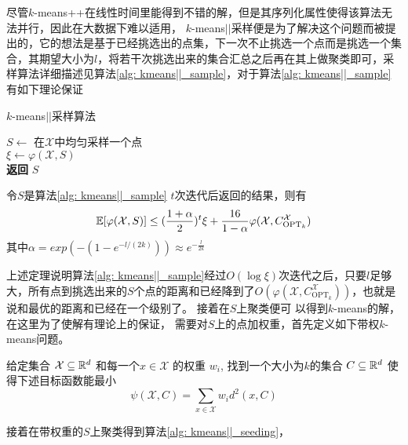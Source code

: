 尽管$k$-means++在线性时间里能得到不错的解，但是其序列化属性使得该算法无法并行，因此在大数据下难以适用， $k$-means\(\vert \vert\)采样便是为了解决这个问题而被提出的，它的想法是基于已经挑选出的点集，下一次不止挑选一个点而是挑选一个集合，其期望大小为$l$，将若干次挑选出来的集合汇总之后再在其上做聚类即可，采样算法详细描述见算法\ref{alg: kmeans||_sample}，对于算法\ref{alg: kmeans||_sample}有如下理论保证
\begin{algorithm}
    \caption{$k$-means\(\vert \vert\)采样算法}\label{alg: kmeans||_sample}
    $S \gets$ 在$\mathcal{X}$中均匀采样一个点 \\
    $\xi \gets \varphi(\mathcal{X},S)$ \\
    \textbf{返回} $S$
\end{algorithm}
\begin{theorem}
    \label{theo: kmeans||_performance_1}
    令$S$是算法\ref{alg: kmeans||_sample} $t$次迭代后返回的结果，则有
    \begin{equation*}
    \mathbb{E}[\varphi(\mathcal{X},S)] \leq (\frac{1+\alpha}{2})^t \xi + \frac{16}{1-\alpha}\varphi(\mathcal{X},C_{\text{OPT}_k}^{\mathcal{X}})
    \end{equation*}
    其中$\alpha=exp(-(1-e^{-l/(2k)})) \approx e^{-\frac{l}{2k}}$
\end{theorem}
上述定理说明算法\ref{alg: kmeans||_sample}经过$O(\log \xi)$次迭代之后，只要$l$足够大，所有点到挑选出来的$S$个点的距离和已经降到了$O(\varphi(\mathcal{X},C_{\text{OPT}_k}^\mathcal{X}))$，也就是说和最优的距离和已经在一个级别了。 接着在$S$上聚类便可
以得到$k$-means的解， 在这里为了使解有理论上的保证， 需要对$S$上的点加权重，首先定义如下带权$k$-means问题。
\begin{definition}[带权$k$-means问题]
    \label{def: weighted_kmeans}
    给定集合 $\mathcal{X} \subseteq \mathbb{R}^d$ 和每一个$x \in \mathcal{X}$ 的权重 $w_i$, 找到一个大小为$k$的集合 $C \subseteq \mathbb{R}^d$ 使得下述目标函数能最小
    \begin{equation*}
        \psi(\mathcal{X},C) = \sum_{x \in \mathcal{X}}w_i d^2 (x,C)
    \end{equation*}
\end{definition}
接着在带权重的$S$上聚类得到算法\ref{alg: kmeans||_seeding}，
